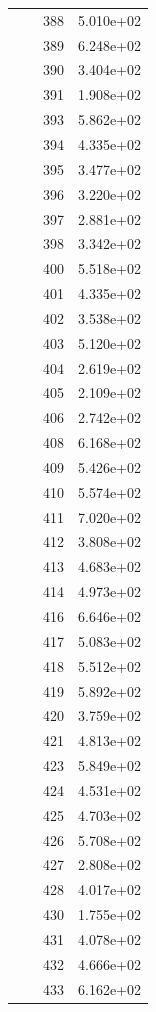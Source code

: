 \documentclass[12pt]{article}
\begin{document}
\begin{longtable}{@{}cccc@{}}
 &  & 388 & 5.010e+02 \\
 &  & 389 & 6.248e+02 \\
 &  & 390 & 3.404e+02 \\
 &  & 391 & 1.908e+02 \\
 &  & 393 & 5.862e+02 \\
 &  & 394 & 4.335e+02 \\
 &  & 395 & 3.477e+02 \\
 &  & 396 & 3.220e+02 \\
 &  & 397 & 2.881e+02 \\
 &  & 398 & 3.342e+02 \\
 &  & 400 & 5.518e+02 \\
 &  & 401 & 4.335e+02 \\
 &  & 402 & 3.538e+02 \\
 &  & 403 & 5.120e+02 \\
 &  & 404 & 2.619e+02 \\
 &  & 405 & 2.109e+02 \\
 &  & 406 & 2.742e+02 \\
 &  & 408 & 6.168e+02 \\
 &  & 409 & 5.426e+02 \\
 &  & 410 & 5.574e+02 \\
 &  & 411 & 7.020e+02 \\
 &  & 412 & 3.808e+02 \\
 &  & 413 & 4.683e+02 \\
 &  & 414 & 4.973e+02 \\
 &  & 416 & 6.646e+02 \\
 &  & 417 & 5.083e+02 \\
 &  & 418 & 5.512e+02 \\
 &  & 419 & 5.892e+02 \\
 &  & 420 & 3.759e+02 \\
 &  & 421 & 4.813e+02 \\
 &  & 423 & 5.849e+02 \\
 &  & 424 & 4.531e+02 \\
 &  & 425 & 4.703e+02 \\
 &  & 426 & 5.708e+02 \\
 &  & 427 & 2.808e+02 \\
 &  & 428 & 4.017e+02 \\
 &  & 430 & 1.755e+02 \\
 &  & 431 & 4.078e+02 \\
 &  & 432 & 4.666e+02 \\
 &  & 433 & 6.162e+02 \\

\end{longtable}
\end{document}
